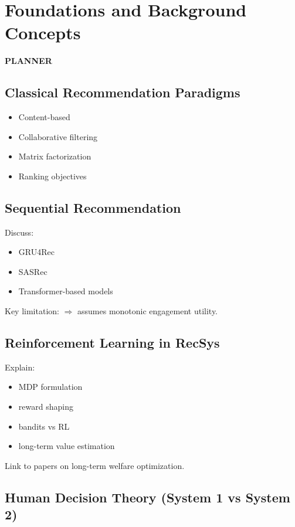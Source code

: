 \section{Foundations and Background Concepts}

\textbf{PLANNER}

\subsection{Classical Recommendation Paradigms}

\begin{itemize}
    \item Content-based
    \item Collaborative filtering
    \item Matrix factorization
    \item Ranking objectives
\end{itemize}

\subsection{Sequential Recommendation}

Discuss:

\begin{itemize}
    \item GRU4Rec
    \item SASRec
    \item Transformer-based models
\end{itemize}

Key limitation:
$\Rightarrow$ assumes monotonic engagement utility.

\subsection{Reinforcement Learning in RecSys}

Explain:

\begin{itemize}
    \item MDP formulation
    \item reward shaping
    \item bandits vs RL
    \item long-term value estimation
\end{itemize}

Link to papers on long-term welfare optimization.

\subsection{Human Decision Theory (System 1 vs System 2)}


